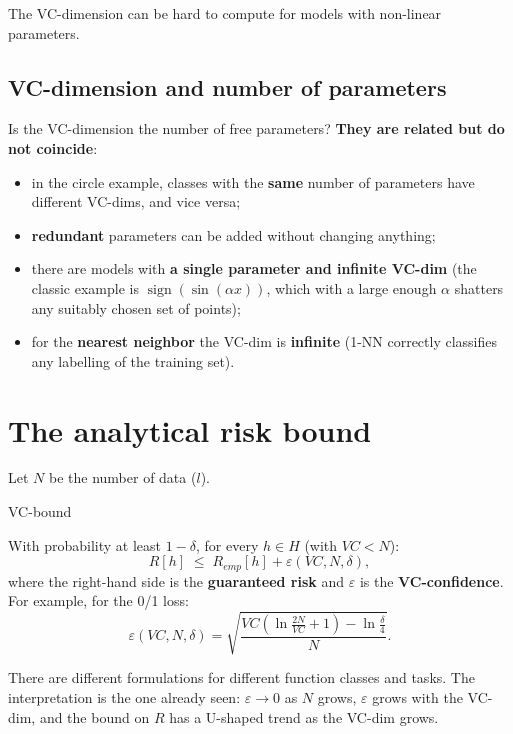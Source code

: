 The VC-dimension can be hard to compute for models with non-linear
parameters.

\subsection{VC-dimension and number of
parameters}\label{vc-dimension-e-numero-di-parametri}

Is the VC-dimension the number of free parameters? \textbf{They are
related but do not coincide}:

\begin{itemize}
\tightlist
\item
  in the circle example, classes with the \textbf{same} number of
  parameters have different VC-dims, and vice versa;
\item
  \textbf{redundant} parameters can be added without changing
  anything;
\item
  there are models with \textbf{a single parameter and infinite
  VC-dim} (the classic example is \(\operatorname{sign}(\sin(\alpha x))\),
  which with a large enough \(\alpha\) shatters any suitably chosen set
  of points);
\item
  for the \textbf{nearest neighbor} the VC-dim is \textbf{infinite}
  (1-NN correctly classifies any labelling of the training set).
\end{itemize}

\section{The analytical risk
bound}\label{il-bound-analitico-sul-rischio}

Let \(N\) be the number of data (\(l\)).

\begin{boxtheorem}{VC-bound}

With probability at least \(1 - \delta\), for every \(h \in H\) (with
\(VC < N\)): \[
R[h] \;\le\; R_{emp}[h] + \varepsilon(VC, N, \delta),
\] where the right-hand side is the \textbf{guaranteed risk} and
\(\varepsilon\) is the \textbf{VC-confidence}. For example, for the 0/1
loss: \[
\varepsilon(VC, N, \delta) = \sqrt{\frac{VC\left(\ln\frac{2N}{VC} + 1\right) - \ln\frac{\delta}{4}}{N}}.
\]

\end{boxtheorem}

There are different formulations for different function classes and
tasks. The interpretation is the one already seen:
\(\varepsilon \to 0\) as \(N\) grows, \(\varepsilon\) grows with the
VC-dim, and the bound on \(R\) has a U-shaped trend as the VC-dim
grows.

